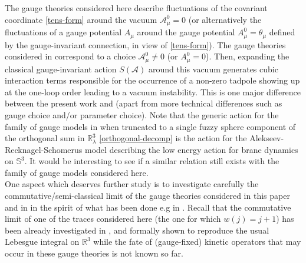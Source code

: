 \documentclass[a4paper,11pt,twoside]{article}
\numberwithin{equation}{section}
\theoremstyle{nonumberplain}
\newcounter{and}
\begin{document}
The gauge theories considered here describe fluctuations of the covariant coordinate \eqref{tens-form} around the vacuum $\mathcal{A}^0_\mu=0$ (or alternatively the fluctuations of a gauge potential $A_\mu$ around the gauge potential $A^0_\mu=\theta_\mu$ defined by the gauge-invariant connection, in view of \eqref{tens-form}). The gauge theories considered in \cite{gervitwal-13} correspond to a choice $\mathcal{A}^0_\mu\ne0$ (or $A^0_\mu=0$). Then, expanding the classical gauge-invariant action $S(\mathcal{A})$ around this vacuum generates cubic interaction terms responsible for the occurrence of a non-zero tadpole showing up at the one-loop order leading to a vacuum instability. This is one major difference between the present work and \cite{gervitwal-13} (apart from more technical differences such as gauge choice and/or parameter choice). Note that the generic action for the family of gauge models in \cite{gervitwal-13} when truncated to a single fuzzy sphere component of the orthogonal sum in $\mathbb{R}^3_\lambda$ \eqref{orthogonal-decomp} is the action for the Alekseev-Recknagel-Schomerus model \cite{ARS} describing the low energy action for brane dynamics on $\mathbb{S}^3$. It would be interesting to see if a similar relation still exists with the family of gauge models considered here.\\
One aspect which deserves further study is to investigate carefully the commutative/semi-classical limit of the gauge theories considered in this paper and in \cite{gervitwal-13} in the spirit of what has been done e.g in \cite{jurman-steina}. Recall that the commutative limit of one of the traces considered here (the one for which $w(j)=j+1$) has been already investigated in \cite{pv-ksmap}, \cite{gervitwal-13} and formally shown to reproduce the usual Lebesgue integral on $\mathbb{R}^3$ while the fate of (gauge-fixed) kinetic operators that may occur in these gauge theories is not known so far.\par
\end{document}
